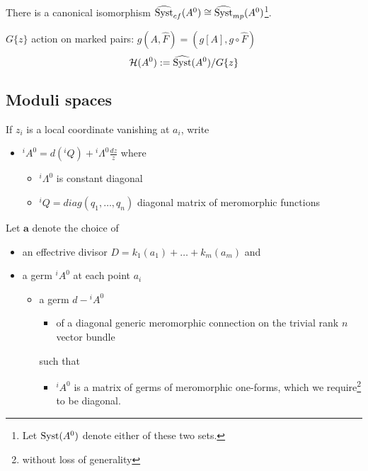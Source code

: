 \begin{lem}
  There is a canonical isomorphism
  $\widehat{\operatorname{Syst}}_{cf}(A^0)\cong\widehat{\operatorname{Syst}}_{mp}(A^0)$\footnote{Let
  $\operatorname{Syst}(A^0)$ denote either of these two sets.}.
\end{lem}

$G\{z\}$ action on marked pairs: $g(A,\hat{F})=(g[A],g\circ\hat{F})$
\[
  \mathcal{H}(A^0):=\widehat{\operatorname{Syst}}(A^0)/G\{z\}
\]
\begin{comment}
  The actions of $T$ and $G\{z\}$ on $\Syst(A^0)$ commute so
  \[
    \Syst(A^0)/G\{z\}\cong\mathcal{H}(A^0)/T \,.
  \]
\end{comment}

\subsection{Moduli spaces}
If $z_i$ is a local coordinate vanishing at $a_i$, write
\begin{itemize}
  \item ${}^iA^0=d({}^iQ)+{}^i\Lambda^0\frac{dz}{z}$ where
    \begin{itemize}
      \item ${}^i\Lambda^0$ is constant diagonal
      \item ${}^iQ=diag(q_1,\dots,q_n)$ diagonal matrix of meromorphic
        functions
    \end{itemize}
\end{itemize}
Let  $\textbf{a}$ denote the choice of
\begin{itemize}
  \item an effectrive divisor $D=k_1(a_1)+\dots+k_m(a_m)$ and
  \item a germ ${}^iA^0$ at each point $a_i$
    \begin{itemize}
      \item a germ $d-{}^iA^0$
        \begin{itemize}
          \item of a diagonal generic meromorphic connection on the trivial
            rank $n$ vector bundle
        \end{itemize}
        such that
        \begin{itemize}
          \item ${}^iA^0$ is a matrix of germs of meromorphic one-forms, which
            we require\footnote{without loss of generality} to be diagonal.
        \end{itemize}
    \end{itemize}
\end{itemize}
